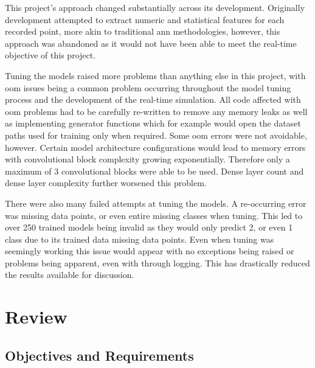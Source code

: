 \documentclass[12pt]{article}
\begin{document}
This project's approach changed substantially across its development. Originally development attempted to extract numeric and statistical features for each recorded point, more akin to traditional \acrshort{ann} methodologies, however, this approach was abandoned as it would not have been able to meet the real-time objective of this project.

Tuning the models raised more problems than anything else in this project, with \acrshort{oom} issues being a common problem occurring throughout the model tuning process and the development of the real-time simulation. All code affected with \acrshort{oom} problems had to be carefully re-written to remove any memory leaks as well as implementing generator functions which for example would open the dataset paths used for training only when required. Some \acrshort{oom} errors were not avoidable, however. Certain model architecture configurations would lead to memory errors with convolutional block complexity growing exponentially. Therefore only a maximum of 3 convolutional blocks were able to be used. Dense layer count and dense layer complexity further worsened this problem.

There were also many failed attempts at tuning the models. A re-occurring error was missing data points, or even entire missing classes when tuning. This led to over 250 trained models being invalid as they would only predict 2, or even 1 class due to its trained data missing data points. Even when tuning was seemingly working this issue would appear with no exceptions being raised or problems being apparent, even with through logging. This has drastically reduced the results available for discussion.

\section{Review}

\subsection{Objectives and Requirements}
\end{document}
